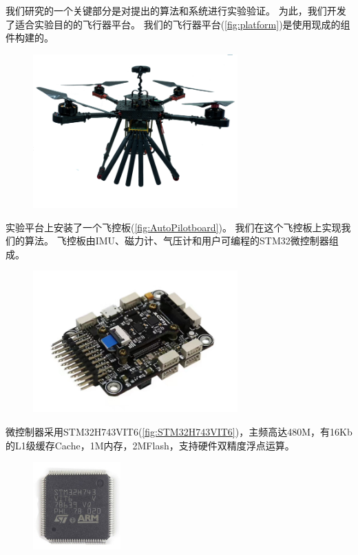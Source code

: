 \documentclass[
  type=master
]{gdutthesis}
\begin{document}
我们研究的一个关键部分是对提出的算法和系统进行实验验证。
为此，我们开发了适合实验目的的飞行器平台。
我们的飞行器平台(\autoref{fig:platform})是使用现成的组件构建的。
\begin{figure}[htbp]
	\centering
	\includegraphics[width=0.7\textwidth]{platform.png}
	\label{fig:platform}
\end{figure} 
实验平台上安装了一个飞控板(\autoref{fig:AutoPilotboard})。
我们在这个飞控板上实现我们的算法。
飞控板由IMU、磁力计、气压计和用户可编程的STM32微控制器组成。
\begin{figure}[htbp]
	\centering
	\includegraphics[width=0.7\textwidth]{acfly.jpg}
	\label{fig:AutoPilotboard}
\end{figure}

微控制器采用STM32H743VIT6(\autoref{fig:STM32H743VIT6})，主频高达480M，有16Kb的L1级缓存Cache，1M内存，2MFlash，支持硬件双精度浮点运算。
\begin{figure}[htbp]
	\centering
	\includegraphics[width=0.3\textwidth]{St-Semiconductor-Chips-Electronic-Component-Lqfp-100-Stm32h743vit6.jpg}
	\label{fig:STM32H743VIT6}
\end{figure}
\end{document}
